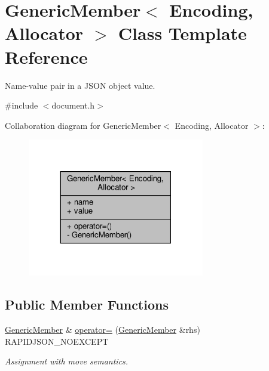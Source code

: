 \hypertarget{classGenericMember}{}\section{Generic\+Member$<$ Encoding, Allocator $>$ Class Template Reference}
\label{classGenericMember}


Name-\/value pair in a J\+S\+ON object value.  




{\ttfamily \#include $<$document.\+h$>$}



Collaboration diagram for Generic\+Member$<$ Encoding, Allocator $>$\+:
\nopagebreak
\begin{figure}[H]
\begin{center}
\leavevmode
\includegraphics[width=218pt]{classGenericMember__coll__graph}
\end{center}
\end{figure}
\subsection*{Public Member Functions}
\begin{DoxyCompactItemize}
\item 
\hyperlink{classGenericMember}{Generic\+Member} \& \hyperlink{classGenericMember_aa6983171b50bdcbb6a456d369680b379}{operator=} (\hyperlink{classGenericMember}{Generic\+Member} \&rhs) R\+A\+P\+I\+D\+J\+S\+O\+N\+\_\+\+N\+O\+E\+X\+C\+E\+PT
\begin{DoxyCompactList}\small\item\em Assignment with move semantics. \end{DoxyCompactList}\end{DoxyCompactItemize}
